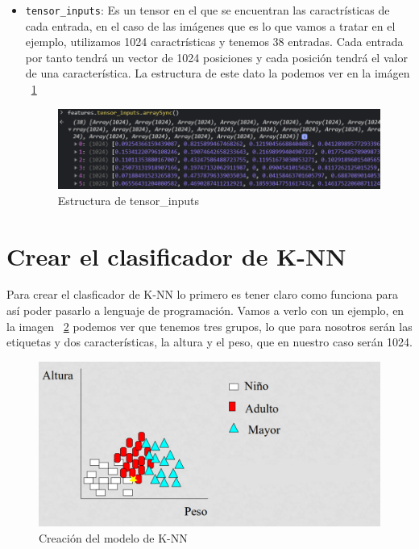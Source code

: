 \documentclass[a4paper, 12pt]{book}
\begin{document}
\begin{itemize}
	\item \texttt{tensor\_inputs}: Es un tensor en el que se encuentran las caractrísticas de cada entrada, en el caso de las imágenes que es lo que vamos a tratar en el ejemplo, utilizamos 1024 caractrísticas y tenemos 38 entradas. Cada entrada por tanto tendrá un vector de 1024 posiciones y cada posición tendrá el valor de una característica. La estructura de este dato la podemos ver en la imágen ~\ref{fig:tensorinputs}

\begin{figure}
	\centering
	\includegraphics[width=12cm, keepaspectratio]{img/tensorinputs}
	\caption{Estructura de tensor\_inputs}				
	\label{fig:tensorinputs}
\end{figure}


\end{itemize}

\section{Crear el clasificador de K-NN} 
\label{sec:knn}

Para crear el clasficador de K-NN lo primero es tener claro como funciona para así poder pasarlo a lenguaje de programación. Vamos a verlo con un ejemplo, en  la imagen ~\ref{fig:ejemploknn} podemos ver que tenemos tres grupos, lo que para nosotros serán las etiquetas y dos características, la altura y el peso, que en nuestro caso serán 1024. 

\begin{figure}
	\centering
	\includegraphics[width=12cm, keepaspectratio]{img/ejemploknn}
	\caption{Creación del modelo de K-NN}				
	\label{fig:ejemploknn}
\end{figure}
\end{document}
